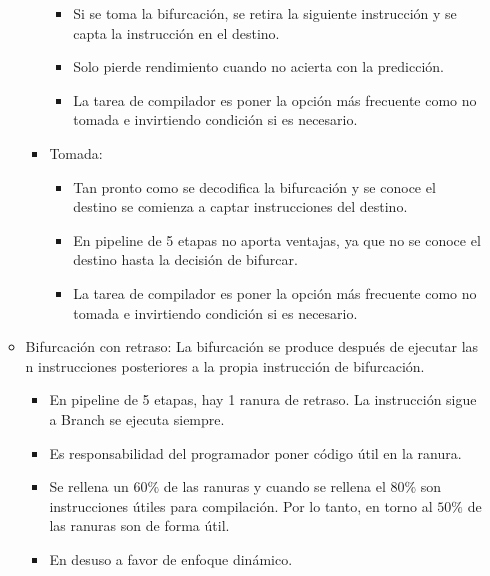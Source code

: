 \documentclass[12pt, twoside, openright]{report} %
\begin{document}
\begin{itemize}
\begin{itemize}
\begin{itemize}
\begin{itemize}
				                  \item Si se toma la bifurcación, se retira la siguiente instrucción y se capta la instrucción en el destino.

				                  \item Solo pierde rendimiento cuando no acierta con la predicción.

				                  \item La tarea de compilador es poner la opción más frecuente como no tomada e invirtiendo condición si es necesario.
			                  \end{itemize}


			            \item Tomada:
			                  \begin{itemize}
				                  \item Tan pronto como se decodifica la bifurcación y se conoce el destino se comienza a captar instrucciones del destino.

				                  \item En pipeline de 5 etapas no aporta ventajas, ya que no se conoce el destino hasta la decisión de bifurcar.

				                  \item La tarea de compilador es poner la opción más frecuente como no tomada e invirtiendo condición si es necesario.
			                  \end{itemize}
		            \end{itemize}


		      \item Bifurcación con retraso: La bifurcación se produce después de ejecutar las n instrucciones posteriores a la propia instrucción de bifurcación.
		            \begin{itemize}
			            \item En pipeline de 5 etapas, hay 1 ranura de retraso. La instrucción sigue a Branch se ejecuta siempre.

			            \item Es responsabilidad del programador poner código útil en la ranura.

			            \item Se rellena un $60\%$ de las ranuras y cuando se rellena el $80\%$ son instrucciones útiles para compilación. Por lo tanto, en torno al $50\%$ de las ranuras son de forma útil.

			            \item En desuso a favor de enfoque dinámico.
		            \end{itemize}


\end{itemize}
\end{itemize}
\end{document}
